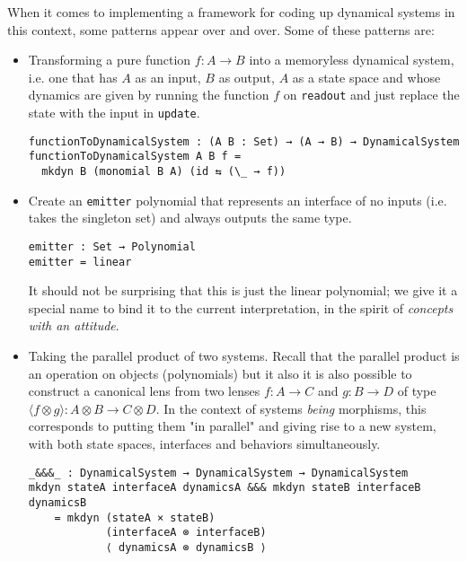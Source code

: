 When it comes to implementing a framework for coding up dynamical systems in this context, some patterns appear over and over. Some of these patterns are: 
\begin{itemize}
    \item Transforming a pure function $f : A \rightarrow B$ into a memoryless dynamical system, i.e. one that has $A$ as an input, $B$ as output, $A$ as a state space and whose dynamics are given by running the function $f$ on \texttt{readout} and just replace the state with the input in \texttt{update}.

        \begin{verbatim}
functionToDynamicalSystem : (A B : Set) → (A → B) → DynamicalSystem
functionToDynamicalSystem A B f = 
  mkdyn B (monomial B A) (id ⇆ (\_ → f))
\end{verbatim}
    \item Create an \texttt{emitter} polynomial that represents an interface of no inputs (i.e. takes the singleton set) and always outputs the same type.
        \begin{verbatim}
emitter : Set → Polynomial
emitter = linear
\end{verbatim}
    It should not be surprising that this is just the linear polynomial; we give it a special name to bind it to the current interpretation, in the spirit of \textit{concepts with an attitude}\cite{conceptwithattitude}.
    \item Taking the parallel product of two systems. Recall that the parallel product is an operation on objects (polynomials) but it also it is also possible to construct a canonical lens from two lenses $f : A \rightarrow C$ and $g : B \rightarrow D$ of type $\langle f \otimes g \rangle : A \otimes B \rightarrow C \otimes D$. In the context of systems \textit{being} morphisms, this corresponds to putting them "in parallel" and giving rise to a new system, with both state spaces, interfaces and behaviors simultaneously.
    \begin{verbatim}
_&&&_ : DynamicalSystem → DynamicalSystem → DynamicalSystem
mkdyn stateA interfaceA dynamicsA &&& mkdyn stateB interfaceB dynamicsB 
    = mkdyn (stateA × stateB)
            (interfaceA ⊗ interfaceB) 
            ⟨ dynamicsA ⊗ dynamicsB ⟩

\end{verbatim}



\end{itemize}
